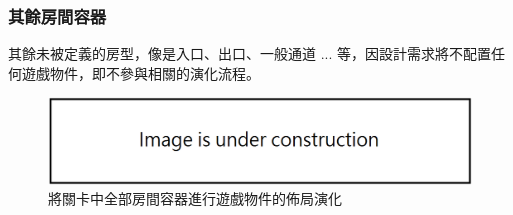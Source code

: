 \subsubsection{其餘房間容器}
\label{sssec:method-segments-appliedonvolumes-others}

其餘未被定義的房型，像是入口、出口、一般通道 ... 等，因設計需求將不配置任何遊戲物件，即不參與相關的演化流程。

\begin{figure}[!htb]
  \begin{center}
    \includegraphics[width=1.0\textwidth]{figures/under_construction.png}
    \caption{將關卡中全部房間容器進行遊戲物件的佈局演化} 
    \label{fig:applied-ga-on-volume-all}
  \end{center}
\end{figure}
